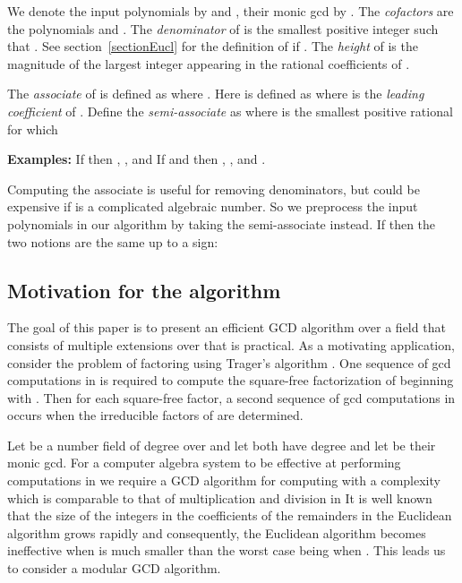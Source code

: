 \documentclass[10pt]{article}
\begin{document}
We denote the input polynomials by  and , their monic gcd by .
The {\em cofactors} are the polynomials  and .
The {\em denominator}  of  is the
smallest positive integer such that .
See section~\ref{sectionEucl} for the definition of 
if .
The {\em height}  of  is the magnitude of the largest
integer appearing in the rational coefficients of .

The {\em associate}  of  is defined as
 where .
Here  is defined as  where  is
the {\em leading coefficient} of .
Define the {\em semi-associate}  as  where
 is the smallest positive rational for which 

\bigskip
\noindent
{\bf Examples:} If  then
, , and 
If  and  then , ,
 and .


\bigskip
\noindent
Computing the associate  is useful for removing denominators,
but could be expensive if  is a complicated algebraic number.
So we preprocess the input polynomials in our algorithm
by taking the semi-associate instead.
If  then the two notions are the same up to a sign:





\subsection{Motivation for the algorithm}
\label{advantages}
The goal of this paper is to present an efficient
GCD algorithm over a field  that consists of
multiple extensions over  that is practical.
As a motivating application, consider the problem of factoring 
using Trager's algorithm \cite{Trager}.
One sequence of gcd computations in  is required to compute the
square-free factorization of  beginning with .
Then for each square-free factor, a second sequence of gcd computations
in  occurs when the irreducible factors of  are determined.

Let  be a number field of degree  over  and
let  both have degree  and let  be their monic gcd.
For a computer algebra system to be effective at performing computations
in  we require a GCD algorithm for computing  with a complexity
which is comparable to that of multiplication and division in 
It is well known that the size of the integers in the
coefficients of the remainders in the Euclidean algorithm grows
rapidly and consequently, the Euclidean algorithm becomes ineffective
when  is much smaller than  the worst case being when .
This leads us to consider a modular GCD algorithm.
\end{document}
